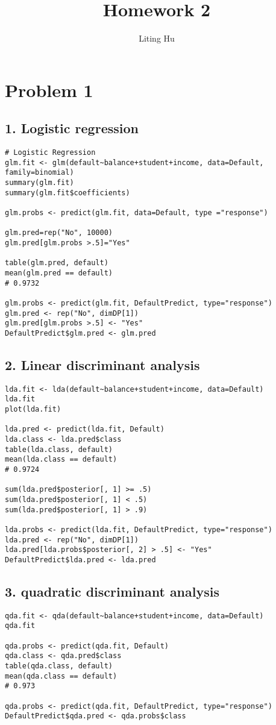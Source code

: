 \documentclass{article}
\begin{document}
  
\title{Homework 2}
\author{Liting Hu}

\maketitle

\section*{Problem 1}
\subsection*{1. Logistic regression}
\begin{verbatim}
# Logistic Regression
glm.fit <- glm(default~balance+student+income, data=Default, family=binomial)
summary(glm.fit)
summary(glm.fit$coefficients)

glm.probs <- predict(glm.fit, data=Default, type ="response")

glm.pred=rep("No", 10000)
glm.pred[glm.probs >.5]="Yes"

table(glm.pred, default)
mean(glm.pred == default)
# 0.9732

glm.probs <- predict(glm.fit, DefaultPredict, type="response")
glm.pred <- rep("No", dimDP[1])
glm.pred[glm.probs >.5] <- "Yes"
DefaultPredict$glm.pred <- glm.pred
\end{verbatim}

\subsection*{2. Linear discriminant analysis}
\begin{verbatim}
lda.fit <- lda(default~balance+student+income, data=Default)
lda.fit
plot(lda.fit)

lda.pred <- predict(lda.fit, Default)
lda.class <- lda.pred$class
table(lda.class, default)
mean(lda.class == default)
# 0.9724

sum(lda.pred$posterior[, 1] >= .5)
sum(lda.pred$posterior[, 1] < .5)
sum(lda.pred$posterior[, 1] > .9)

lda.probs <- predict(lda.fit, DefaultPredict, type="response")
lda.pred <- rep("No", dimDP[1])
lda.pred[lda.probs$posterior[, 2] > .5] <- "Yes"
DefaultPredict$lda.pred <- lda.pred
\end{verbatim}

\subsection*{3. quadratic discriminant analysis}
\begin{verbatim}
qda.fit <- qda(default~balance+student+income, data=Default)
qda.fit

qda.probs <- predict(qda.fit, Default)
qda.class <- qda.pred$class
table(qda.class, default)
mean(qda.class == default)
# 0.973

qda.probs <- predict(qda.fit, DefaultPredict, type="response")
DefaultPredict$qda.pred <- qda.probs$class
\end{verbatim}
\end{document}
